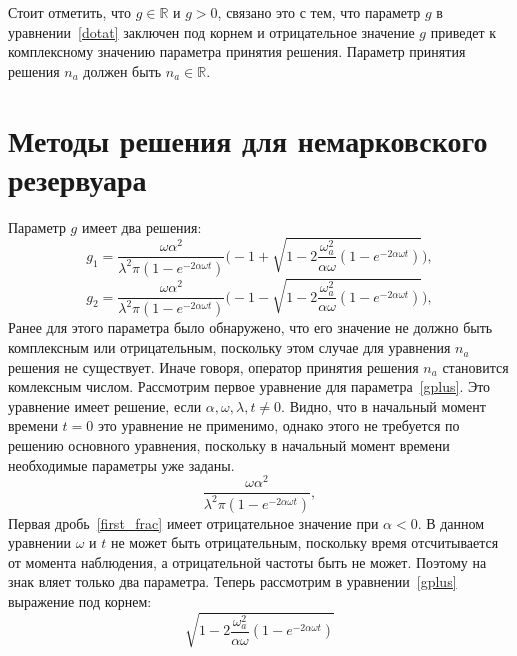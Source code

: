 Стоит отметить, что $g \in \mathbb{R}$ и $g > 0$, связано это с тем, что параметр $g$ в уравнении~\eqref{dotat}
заключен под корнем и отрицательное значение $g$ приведет к комплексному значению параметра принятия решения.
Параметр принятия решения $n_a$ должен быть $n_a \in \mathbb{R}$.

\section{Методы решения для немарковского резервуара}

Параметр $g$ имеет два решения:
\begin{equation}\label{gplus}
    g_{1} = \frac{\omega \alpha^{2}}{\lambda^{2} \pi (1-e^{-2 \alpha \omega t})}
    \Biggl( -1 + \sqrt{1 - 2 \frac{\omega^{2}_{a} }{\alpha \omega} (1-e^{-2 \alpha \omega t})} \Biggr),
\end{equation}
\begin{equation}\label{gminus}
    g_{2} = \frac{\omega \alpha^{2}}{\lambda^{2} \pi (1-e^{-2 \alpha \omega t})}
    \Biggl( -1 - \sqrt{1 - 2 \frac{\omega^{2}_{a} }{\alpha \omega} (1-e^{-2 \alpha \omega t})} \Biggr),
\end{equation}
Ранее для этого параметра было обнаружено, что его значение не должно быть комплексным или отрицательным,
поскольку этом случае для уравнения $n_{a}$ решения не существует.
Иначе говоря, оператор принятия решения $n_{a}$ становится комлексным числом.
Рассмотрим первое уравнение для параметра~\eqref{gplus}.
Это уравнение имеет решение, если $\alpha, \omega, \lambda, t \neq 0$.
Видно, что в начальный момент времени $t = 0$ это уравнение не применимо, однако этого не требуется
по решению основного уравнения, поскольку в начальный момент времени необходимые параметры уже заданы.
\begin{equation}\label{first_frac}
    \frac{\omega \alpha^{2}}{\lambda^{2} \pi (1-e^{-2 \alpha \omega t})},
\end{equation}
Первая дробь~\eqref{first_frac} имеет отрицательное значение при $\alpha < 0$.
В данном уравнении $\omega$ и $t$ не может быть отрицательным, поскольку время отсчитывается от
момента наблюдения, а отрицательной частоты быть не может.
Поэтому на знак вляет только два параметра.
Теперь рассмотрим в уравнении~\eqref{gplus} выражение под корнем:
\begin{equation}\label{last_square}
    \sqrt{1 - 2 \frac{\omega^{2}_{a} }{\alpha \omega} (1-e^{-2 \alpha \omega t})}
\end{equation}
